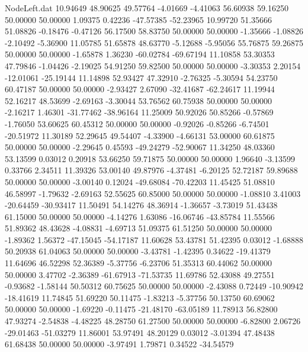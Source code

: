\begin{filecontents}{NodeLeft.dat}
  10.94649   48.90625   49.57764    -4.01669   -4.41063   56.60938   59.16250   50.00000   50.00000    1.09375    0.42236  -47.57385  -52.23965
  10.99720   51.35666   51.08826    -0.18476   -0.47126   56.17500   58.83750   50.00000   50.00000   -1.35666   -1.08826   -2.10492   -5.36900
  11.05785   51.65878   48.63770    -5.12688   -5.95056   55.76875   59.26875   50.00000   50.00000   -1.65878    1.36230  -60.02784  -69.67194
  11.10858   53.30353   47.79846    -1.04426   -2.19025   54.91250   59.82500   50.00000   50.00000   -3.30353    2.20154  -12.01061  -25.19144
  11.14898   52.93427   47.32910    -2.76325   -5.30594   54.23750   60.47187   50.00000   50.00000   -2.93427    2.67090  -32.41687  -62.24617
  11.19944   52.16217   48.53699    -2.69163   -3.30044   53.76562   60.75938   50.00000   50.00000   -2.16217    1.46301  -31.77462  -38.96164
  11.25009   50.92026   50.85266    -0.57869   -1.76050   53.60625   60.45312   50.00000   50.00000   -0.92026   -0.85266   -6.74501  -20.51972
  11.30189   52.29645   49.54407    -4.33900   -4.66131   53.00000   60.61875   50.00000   50.00000   -2.29645    0.45593  -49.24279  -52.90067
  11.34250   48.03360   53.13599     0.03012    0.20918   53.66250   59.71875   50.00000   50.00000    1.96640   -3.13599    0.33766    2.34511
  11.39326   53.00140   49.87976    -4.37481   -6.20125   52.72187   59.89688   50.00000   50.00000   -3.00140    0.12024  -49.68084  -70.42203
  11.45425   51.08810   46.58997    -1.79632   -2.69163   52.55625   60.85000   50.00000   50.00000   -1.08810    3.41003  -20.64459  -30.93417
  11.50491   54.14276   48.36914    -1.36657   -3.73019   51.43438   61.15000   50.00000   50.00000   -4.14276    1.63086  -16.06746  -43.85784
  11.55566   51.89362   48.43628    -4.08831   -4.69713   51.09375   61.51250   50.00000   50.00000   -1.89362    1.56372  -47.15045  -54.17187
  11.60628   53.43781   51.42395     0.03012   -1.68888   50.20938   61.04063   50.00000   50.00000   -3.43781   -1.42395    0.34622  -19.41379
  11.64696   46.52298   52.36389    -5.37756   -6.23706   51.35313   60.44062   50.00000   50.00000    3.47702   -2.36389  -61.67913  -71.53735
  11.69786   52.43088   49.27551    -0.93682   -1.58144   50.50312   60.75625   50.00000   50.00000   -2.43088    0.72449  -10.90942  -18.41619
  11.74845   51.69220   50.11475    -1.83213   -5.37756   50.13750   60.69062   50.00000   50.00000   -1.69220   -0.11475  -21.48170  -63.05189
  11.78913   56.82800   47.93274    -2.54838   -4.48225   48.28750   61.27500   50.00000   50.00000   -6.82800    2.06726  -29.01463  -51.03279
  11.86001   53.97491   48.20129     0.03012   -3.01394   47.48438   61.68438   50.00000   50.00000   -3.97491    1.79871    0.34522  -34.54579

\end{filecontents}
